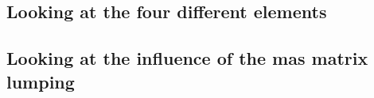 

\subsection*{Looking at the four different elements}




\subsection*{Looking at the influence of the mas matrix lumping}

